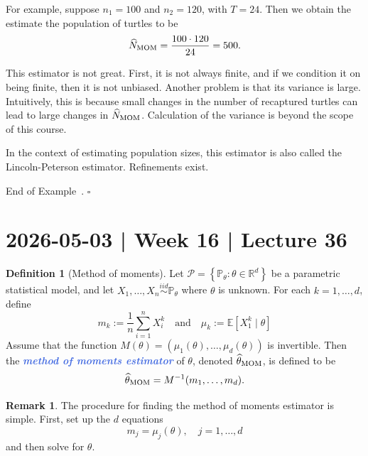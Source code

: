 \documentclass[10pt]{article}
\theoremstyle{definition}
\newtheorem{definition}[theorem]{Definition}
\newtheorem{remark}[theorem]{Remark}
\newtheorem{example}[theorem]{Example}
\renewenvironment{example}
{\begin{oldexample}}
  {\par\smallskip\hfill   End of Example~\theexample. $\square$    \par\end{oldexample}}
\newcommand{\1}[1]{\textbf{1}_{\left[#1\right]}} %
\def\R{\mathbb{R}} %
\def\E{\mathbb{E}} %
\def\P{\mathbb{P}} %
\newcommand{\demph}[1]{\textcolor{RoyalBlue}{\textbf{\slshape #1}}} %
\begin{document}
\begin{example}[Mark-and-recapture]
  
  For example, suppose $n_{1} = 100$ and $n_{2}=120$, with $T = 24$. Then we
  obtain the estimate the population of turtles to be
  \begin{equation*}
    \widehat{N}_{\rm MOM} = \frac{100\cdot 120}{24} = 500.
  \end{equation*}

  This estimator is not great. First, it is not always finite, and if we
  condition it on being finite, then it is not unbiased. Another problem is
  that its variance is large. Intuitively, this is because small changes in
  the number of recaptured turtles can lead to large changes in
  $\widehat{N}_{\rm MOM}$. Calculation of the variance is beyond the scope of
  this course.

  In the context of estimating population sizes, this estimator is also called
  the Lincoln-Peterson estimator. Refinements exist. 
  
\end{example}

\newpage
\section{2026-05-03 | Week 16 | Lecture 36}
\begin{definition}[Method of moments]
  \label{def:method-moments}
  Let $\mathcal{P}= \left\{\P_{\theta}:\theta\in \R^{d}\right\}$ be a
  parametric statistical model, and let
  $X_{1},\ldots,X_{n}\overset{iid}{\sim}\P_{\theta}$ where $\theta$ is
  unknown. For each $k=1,\ldots,d$, define
  \begin{equation*}
    m_{k} := \frac{1}{n}\sum_{i=1}^{n}X_{i}^{k} 
    \quad \text{and} \quad 
    \mu_{k} := \E[X^{k}_{1} \mid \theta]
  \end{equation*}
  Assume that the function
  $M(\theta)= (\mu_{1}(\theta),\ldots,\mu_{d}(\theta))$ is invertible. Then the
  \demph{method of moments estimator} of $\theta$, denoted
  $\widehat{\theta}_{\rm MOM}$, is defined to be
  \begin{equation*}
    \widehat{\theta}_{\rm MOM} = M^{-1}(m_{1},\ldots,m_{d}).
  \end{equation*}
\end{definition}
\begin{remark}
  The procedure for finding the method of moments estimator is simple. First,
  set up the $d$ equations
  \begin{equation*}
    m_{j} = \mu_{j}(\theta), \quad j=1,\ldots,d
  \end{equation*}
  and then solve for $\theta$.
\end{remark}
\end{document}
